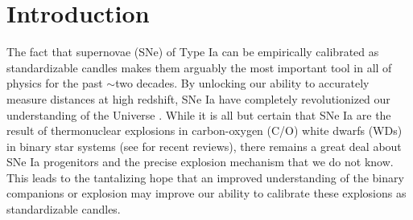 \documentclass[twocolumn]{./aastex63}
\begin{document}

\section{Introduction}

The fact that supernovae (SNe) of Type Ia can be empirically calibrated as
standardizable candles makes them arguably the most important tool in all of
physics for the past $\sim$two decades. By unlocking our ability to accurately
measure distances at high redshift, SNe Ia have completely revolutionized our
understanding of the Universe \citep{Riess98,Perlmutter99}. While it is all
but certain that SNe Ia are the result of thermonuclear explosions in
carbon-oxygen (C/O) white dwarfs (WDs) in binary star systems (see
\citealt{Maoz14,Livio18} for recent reviews), there remains a great deal about
SNe Ia progenitors and the precise explosion mechanism that we do not know.
This leads to the tantalizing hope that an improved understanding of the
binary companions or explosion may improve our ability to calibrate these
explosions as standardizable candles.
\end{document}
